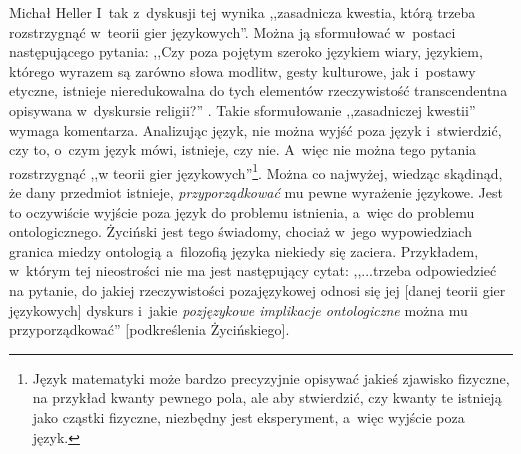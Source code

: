 \begin{artplenv}{Michał Heller}
I~tak z~dyskusji tej wynika ,,zasadnicza kwestia, którą trzeba rozstrzygnąć w~teorii gier językowych''. Można ją sformułować w~postaci następującego pytania: ,,Czy poza pojętym szeroko językiem wiary, językiem, którego wyrazem są zarówno słowa modlitw, gesty kulturowe, jak i~postawy etyczne, istnieje nieredukowalna do tych elementów rzeczywistość transcendentna opisywana w~dyskursie religii?''
\parencite[][s.~16]{zycinski_teizm_1985}. %
 Takie sformułowanie ,,zasadniczej kwestii'' wymaga komentarza. Analizując język, nie można wyjść poza język i~stwierdzić, czy to, o~czym język mówi, istnieje, czy nie. A~więc nie można tego pytania rozstrzygnąć ,,w teorii gier językowych''\footnote{ Język matematyki może bardzo precyzyjnie opisywać jakieś zjawisko fizyczne, na przykład kwanty pewnego pola, ale aby stwierdzić, czy kwanty te istnieją jako cząstki fizyczne, niezbędny jest eksperyment, a~więc wyjście poza język.}. Można co najwyżej, wiedząc skądinąd, że dany przedmiot istnieje, \textit{przyporządkować} mu pewne wyrażenie językowe. Jest to oczywiście wyjście poza język do problemu istnienia, a~więc do problemu ontologicznego. Życiński jest tego świadomy, chociaż w~jego wypowiedziach granica miedzy ontologią a~filozofią języka niekiedy się zaciera. Przykładem, w~którym tej nieostrości nie ma jest następujący cytat: ,,...trzeba odpowiedzieć na pytanie, do jakiej rzeczywistości pozajęzykowej odnosi się jej [danej teorii gier językowych] dyskurs i~jakie \textit{pozjęzykowe implikacje ontologiczne} można mu przyporządkować'' 
\parencite[][s.~18]{zycinski_teizm_1985}%
[podkreślenia Życińskiego].


\end{artplenv}

